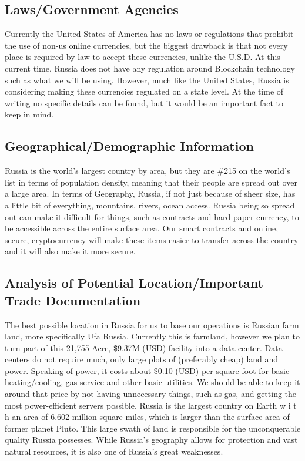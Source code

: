 \documentclass[12pt]{article}
\begin{document}
\subsection{Laws/Government Agencies}
Currently the United States of America has no laws or regulations that prohibit the use of
non-us online currencies, but the biggest drawback is that not every place is required by law to
accept these currencies, unlike the U.S.D. At this current time, Russia does not have any
regulation around Blockchain technology such as what we will be using. However, much
like the United States, Russia is considering making these currencies regulated on a state
level. At the time of writing no specific details can be found, but it would be an important
fact to keep in mind. 
\subsection{Geographical/Demographic Information}
Russia is the world's largest country by area, but they are \#215 on the world's list in terms
of population density, meaning that their people are spread out over a large area. In terms
of Geography, Russia, if not just because of sheer size, has a little bit of everything,
mountains, rivers, ocean access. Russia being so spread out can make it difficult for things, such as contracts and hard paper currency, to be accessible across the entire surface area. Our smart contracts and online, secure, cryptocurrency will make these items easier to transfer across the country and it will also make it more secure.

\subsection{Analysis of Potential Location/Important Trade Documentation}
The best possible location in Russia for us to base our operations is Russian farm land,
more specifically Ufa Russia. Currently this is farmland, however we plan to turn part of
this 21,755 Acre, \$9.37M (USD) facility into a data center. Data centers do not require
much, only large plots of (preferably cheap) land and power. Speaking of power, it costs
about \$0.10 (USD) per square foot for basic heating/cooling, gas service and other basic
utilities. We should be able to keep it around that price by not having unnecessary things,
such as gas, and getting the most power-efficient servers possible. Russia is the largest
country on Earth w i t h an area of 6.602 million square miles, which is larger than the
surface area of former planet Pluto. This large swath of land is responsible for the
unconquerable quality Russia possesses. While Russia's geography allows for
protection and vast natural resources, it is also one of Russia's great weaknesses.
\pagebreak
\end{document}

